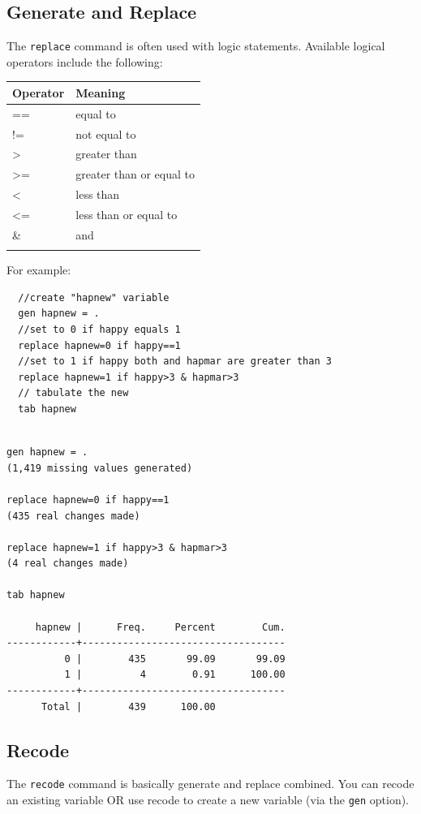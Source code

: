 \documentclass[]{book}
\begin{document}
\subsection{Generate and Replace}\label{generate-and-replace}

The \texttt{replace} command is often used with logic statements.
Available logical operators include the following:

\begin{longtable}[]{@{}ll@{}}
\toprule
Operator & Meaning\tabularnewline
\midrule
\endhead
== & equal to\tabularnewline
!= & not equal to\tabularnewline
\textgreater{} & greater than\tabularnewline
\textgreater{}= & greater than or equal to\tabularnewline
\textless{} & less than\tabularnewline
\textless{}= & less than or equal to\tabularnewline
\& & and\tabularnewline
&\tabularnewline
\bottomrule
\end{longtable}

For example:

\begin{verbatim}
  //create "hapnew" variable
  gen hapnew = .
  //set to 0 if happy equals 1
  replace hapnew=0 if happy==1 
  //set to 1 if happy both and hapmar are greater than 3
  replace hapnew=1 if happy>3 & hapmar>3 
  // tabulate the new 
  tab hapnew
\end{verbatim}

\begin{verbatim}

gen hapnew = .
(1,419 missing values generated)

replace hapnew=0 if happy==1 
(435 real changes made)

replace hapnew=1 if happy>3 & hapmar>3 
(4 real changes made)

tab hapnew

     hapnew |      Freq.     Percent        Cum.
------------+-----------------------------------
          0 |        435       99.09       99.09
          1 |          4        0.91      100.00
------------+-----------------------------------
      Total |        439      100.00
\end{verbatim}

\subsection{Recode}\label{recode}

The \texttt{recode} command is basically generate and replace combined.
You can recode an existing variable OR use recode to create a new
variable (via the \texttt{gen} option).
\end{document}
